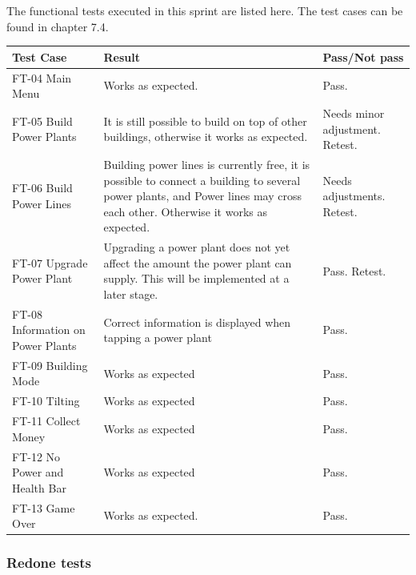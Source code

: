 	The functional tests executed in this sprint are listed here. The test cases can be found in chapter 7.4.


	\begin{tabular}{| p{2cm} | p{7cm} | p{3cm} |}
		\hline
		\rowcolor{lightgray}
		{\bf Test Case} & {\bf Result} & {\bf Pass/Not pass} \\ \hline
	  	
	  	FT-04 Main Menu & Works as expected. & Pass. \\ \hline

		FT-05 Build Power Plants & It is still possible to build on top of other buildings, otherwise it works as expected. & Needs minor adjustment. Retest. \\ \hline

		FT-06 Build Power Lines & Building power lines is currently free, it is possible to connect a building to several power plants, and Power lines may cross each other. Otherwise it works as expected. & Needs adjustments. Retest. \\ \hline

		FT-07 Upgrade Power Plant & Upgrading a power plant does not yet affect the amount the power plant can supply. This will be implemented at a later stage. & Pass. Retest. \\ \hline

		FT-08 Information on Power Plants & Correct information is displayed when tapping a power plant & Pass.\\ \hline

		FT-09 Building Mode & Works as expected & Pass. \\ \hline

		FT-10 Tilting & Works as expected & Pass. \\ \hline

		FT-11 Collect Money & Works as expected & Pass. \\ \hline

		FT-12 No Power and Health Bar & Works as expected & Pass. \\ \hline

		FT-13 Game Over & Works as expected. & Pass. \\ \hline

	\end{tabular}

	\subsubsection{Redone tests}

